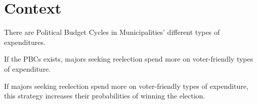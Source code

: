 \section{Context}










\begin{hyp}\label{hyp:first}
	There are Political Budget Cycles in Municipalities' different types of expenditures. 
\end{hyp}

\begin{hyp} \label{hyp:second}
	If the PBCs exists, majors seeking reelection spend more on voter-friendly types of expenditure. 
\end{hyp}

\begin{hyp} \label{hyp:third}
	If majors seeking reelection spend more on voter-friendly types of expenditure, this strategy increases their probabilities of winning the election. 
\end{hyp}
